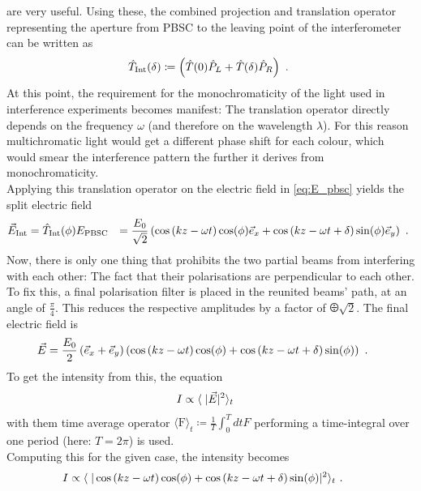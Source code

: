 are very useful. Using these, the combined projection and translation operator representing the aperture from PBSC to the leaving point of the interferometer can be written as 
\begin{align}
  \hat{T}_\text{Int}(\delta) \coloneqq \left(\hat T(0)\hat{P}_L + \hat T(\delta)\hat{P}_R\right) \text{ . }
\end{align}
At this point, the requirement for the monochromaticity of the light used in interference experiments becomes manifest: The translation operator directly depends on the frequency $\omega$ (and therefore on the wavelength $\lambda$). For this reason multichromatic light would get a different phase shift for each colour, which would smear the interference pattern the further it derives from monochromaticity.\\
Applying this translation operator on the electric field in \autoref{eq:E_pbsc} yields the split electric field 
\begin{align}
  \vec{E}_\text{Int} &= \hat{T}_\text{Int}(\phi) E_\text{PBSC} &= \frac{E_0}{\sqrt{2}} \left( \cos\left(kz - \omega t\right) \cos(\phi)\vec{e}_x + \cos\left(kz - \omega t + \delta\right) \sin(\phi) \vec{e}_y \right) \text{ . }
\end{align}
Now, there is only one thing that prohibits the two partial beams from interfering with each other: The fact that their polarisations are perpendicular to each other. To fix this, a final polarisation filter is placed in the reunited beams' path, at an angle of $\frac{\pi}{4}$. This reduces the respective amplitudes by a factor of $\odiv{\sqrt{2}}$. The final electric field is 
\begin{align}
  \vec{E} &= \frac{E_0}{2} \left( \vec{e}_x + \vec{e}_y \right) \left( \cos\left(kz - \omega t\right) \cos(\phi) + \cos\left(kz - \omega t + \delta\right) \sin(\phi) \right) \text{ . }
\end{align}
To get the intensity from this, the equation 
\begin{align}
  I &\propto \langle \hspace{1mm} |\vec{E}|^2\rangle_t
\end{align}
with them time average operator $\langle\text{F}\rangle_t \coloneqq \frac{1}{T}\int_0^T dt F$ performing a time-integral over one period (here: $T = 2\pi$) is used.\\
Computing this for the given case, the intensity becomes
\begin{align}
  I &\propto \langle \hspace{1mm} |\cos\left(kz - \omega t\right) \cos(\phi) + \cos\left(kz - \omega t + \delta\right) \sin(\phi) |^2\rangle_t \text{ . }
\end{align}
